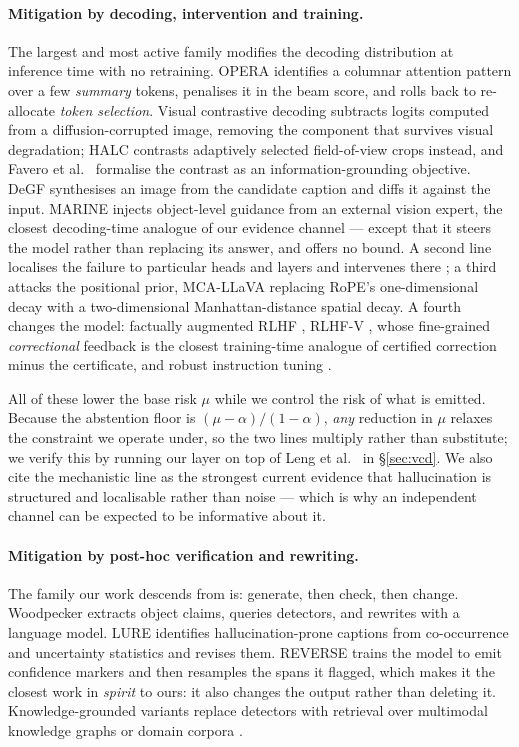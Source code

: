 \documentclass[review,number,doubleblind]{elsarticle}
\theoremstyle{plain}
\theoremstyle{definition}
\theoremstyle{remark}
\begin{document}
\paragraph{Mitigation by decoding, intervention and training.}
The largest and most active family modifies the decoding distribution at inference time with
no retraining. OPERA \citep{opera} identifies a columnar attention pattern over a few
\emph{summary} tokens, penalises it in the beam score, and rolls back to re-allocate
\emph{token selection}. Visual contrastive decoding \citep{vcd} subtracts logits computed from
a diffusion-corrupted image, removing the component that survives visual degradation; HALC
\citep{chen2024halc} contrasts adaptively selected field-of-view crops instead, and
Favero et al.~\cite{favero2024} formalise the contrast as an information-grounding objective. DeGF
\citep{degf} synthesises an image from the candidate caption and diffs it against the input.
MARINE \citep{marine} injects object-level guidance from an external vision expert, the
closest decoding-time analogue of our evidence channel --- except that it steers the model
rather than replacing its answer, and offers no bound. A second line localises the failure to
particular heads and layers and intervenes there \citep{attnlens,only,maskcd,causalgating};
a third attacks the positional prior, MCA-LLaVA \citep{mcallava} replacing RoPE's
one-dimensional decay with a two-dimensional Manhattan-distance spatial decay. A fourth
changes the model: factually augmented RLHF \citep{sun2024aligning}, RLHF-V
\citep{yu2024rlhfv}, whose fine-grained \emph{correctional} feedback is the closest
training-time analogue of certified correction minus the certificate, and robust instruction
tuning \citep{liu2023lrv}.

All of these lower the base risk $\mu$ while we control the risk of what is emitted. Because
the abstention floor is $(\mu-\alpha)/(1-\alpha)$, \emph{any} reduction in $\mu$ relaxes the
constraint we operate under, so the two lines multiply rather than substitute; we verify this
by running our layer on top of Leng et al.~\cite{vcd} in \S\ref{sec:vcd}. We also cite the mechanistic
line as the strongest current evidence that hallucination is structured and localisable
rather than noise --- which is why an independent channel can be expected to be informative
about it.

\paragraph{Mitigation by post-hoc verification and rewriting.}
The family our work descends from is: generate, then check, then change. Woodpecker
\citep{woodpecker} extracts object claims, queries detectors, and rewrites with a language
model. LURE \citep{lure} identifies hallucination-prone captions from co-occurrence and
uncertainty statistics and revises them. REVERSE \citep{reverse} trains the model to emit
confidence markers and then resamples the spans it flagged, which makes it the closest work in
\emph{spirit} to ours: it also changes the output rather than deleting it. Knowledge-grounded
variants replace detectors with retrieval over multimodal knowledge graphs \citep{mkgrag} or
domain corpora \citep{rule}.
\end{document}

